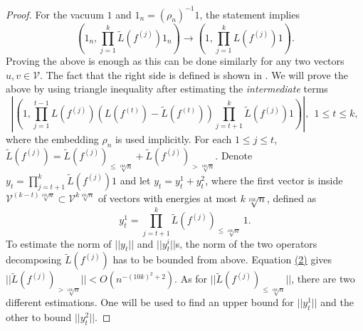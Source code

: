 \documentclass[twoside,11pt,titlepage]{amsart}
\renewcommand{\=}[1]{\stackrel{#1}{=}} %
\theoremstyle{definition}
\theoremstyle{remark}
\begin{document}
\begin{proof}
For the vacuum $1$ and $1_n=(\rho_n)^{-1}1$, the statement implies 
$$(1_n, \prod_{j=1}^k \widetilde{L}(f^{(j)}) 1_n) \to (1,\prod_{j=1}^k L(f^{(j)})1).$$
Proving the above is enough as this can be done similarly for any two vectors $u,v \in \mathcal{V}$. The fact that the right side is defined is shown in \cite[Lemma 3.2.1]{weiner2007conformal}. We will prove the above by using triangle inequality after estimating the \textit{intermediate} terms
$$ |(1,  \prod_{j=1}^{t-1} L(f^{(j)}) (L(f^{(t)})-\widetilde{L}(f^{(t)}))\prod_{j=t+1}^k \widetilde{L}(f^{(j)})1)|, \ \   1 \le t \le k,$$
where the embedding $\rho_n$ is used implicitly. For each $1\le j \le t$, $\widetilde{L}(f^{(j)})=\widetilde{L}(f^{(j)})_{\le \sqrt[10k]{n}}+\widetilde{L}(f^{(j)})_{> \sqrt[10k]{n}}$. Denote $y_t=\prod_{j=t+1}^k \widetilde{L}(f^{(j)})1$ and let $y_t=y_t^1+y_t^2$, where the first vector is inside $\mathcal{V}^{(k-t)\sqrt[10k]{n}} \subset \mathcal{V}^{k\sqrt[10k]{n}}$ of vectors with energies at most $k\sqrt[10k]{n}$, defined as
$$y_t^1=\prod_{j=t+1}^{k} \widetilde{L}(f^{(j)})_{\le \sqrt[10k]{n}}\  1.$$
To estimate the norm of $||y_t||$ and $||y_t^i||$s, the norm of the two operators decomposing $\widetilde{L}(f^{(j)})$ has to be bounded from above. Equation \hyperref[eq2]{(2)} gives $||\widetilde{L}(f^{(j)})_{> \sqrt[10k]{n}}|| <O(n^{-(10k)^2+2})$. As for $||\widetilde{L}(f^{(j)})_{\le \sqrt[10k]{n}}||$, there are two different estimations. One will be used to find an upper bound for $||y_t^1||$ and the other to bound $||y_t^2||$.


\end{proof}
\end{document}
